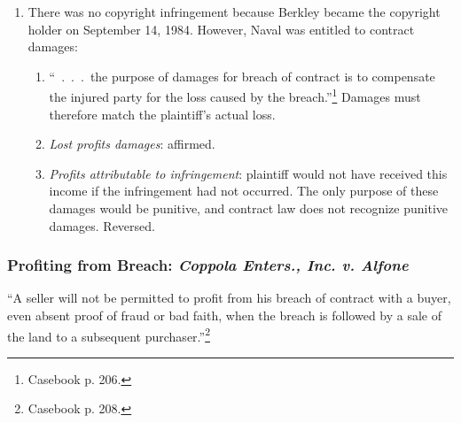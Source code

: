 \begin{enumerate}
\begin{enumerate}
        \item There was no copyright infringement because Berkley became the 
        copyright holder on September 14, 1984. However, Naval was entitled to 
        contract damages:
        \begin{enumerate}
            \item ``~.~.~.~the purpose of damages for breach of contract is to 
            compensate the injured party for the loss caused by the 
            breach.''\footnote{Casebook p. 206.} Damages must therefore match 
            the plaintiff's actual loss.
            \item \emph{Lost profits damages}: affirmed.
            \item \emph{Profits attributable to infringement}: plaintiff would 
            not have received this income if the infringement had not 
            occurred. The only purpose of these damages would be punitive, and 
            contract law does not recognize punitive damages. Reversed.
        \end{enumerate}
    \end{enumerate}
\end{enumerate}

\subsubsection{Profiting from Breach: \emph{Coppola Enters., Inc. v. Alfone}}

``A seller will not be permitted to profit from his breach of contract with a 
buyer, even absent proof of fraud or bad faith, when the breach is followed by 
a sale of the land to a subsequent purchaser.''\footnote{Casebook p. 208.}


